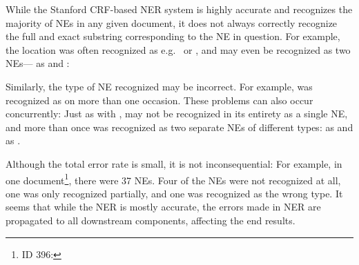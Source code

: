 While the Stanford CRF-based NER system is highly accurate and recognizes the majority of NEs in any given document, it does not always correctly recognize the full and exact substring corresponding to the NE in question. For example, the location  was often recognized as e.g.\   or , and may even be recognized as two NEs--- as  and :

Similarly, the type of NE recognized may be incorrect. For example,  was recognized as  on more than one occasion. These problems can also occur concurrently: Just as with ,  may not be recognized in its entirety as a single NE, and more than once was recognized as two separate NEs of different types:  as  and  as .

Although the total error rate is small, it is not inconsequential: For example, in one document\footnote{ID 396: }, there were 37 NEs. Four of the NEs were not recognized at all, one was only recognized partially, and one was recognized as the wrong type. It seems that while the NER is mostly accurate, the errors made in NER are propagated to all downstream components, affecting the end results.
